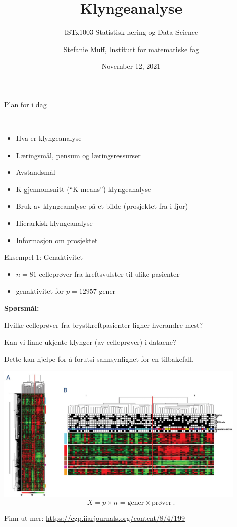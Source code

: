 \documentclass[10pt,ignorenonframetext,]{beamer}
\title{Klyngeanalyse}
\subtitle{ISTx1003 Statistisk læring og Data Science}
\author{Stefanie Muff, Institutt for matematiske fag}
\date{November 12, 2021}
\begin{document}
\frame{\titlepage}

\begin{frame}{Plan for i dag}
\protect\hypertarget{plan-for-i-dag}{}

\(~\)

\begin{itemize}
\item
  Hva er klyngeanalyse
\item
  Læringsmål, pensum og læringsressurser
\item
  Avstandsmål
\item
  K-gjennomsnitt (``K-means'') klyngeanalyse
\item
  Bruk av klyngeanalyse på et bilde (prosjektet fra i fjor)
\item
  Hierarkisk klyngeanalyse
\item
  Informasjon om prosjektet
\end{itemize}

\end{frame}

\begin{frame}{Eksempel 1: Genaktivitet}
\protect\hypertarget{eksempel-1-genaktivitet}{}

\begin{itemize}
\item
  \(n=81\) celleprøver fra kreftsvulster til ulike pasienter
\item
  genaktivitet for \(p =12957\) gener
\end{itemize}

\vspace{2mm}

\textbf{Spørsmål:}

Hvilke celleprøver fra brystkreftpasienter ligner hverandre mest?

Kan vi finne ukjente klynger (av celleprøver) i dataene?

Dette kan hjelpe for å forutsi sannsynlighet for en tilbakefall.

\end{frame}

\begin{frame}

\centering

\includegraphics[width=0.9\textwidth,height=\textheight]{gene_expression.jpg}
\[ X = p\times n  =  \text{gener} \times \text{prøver}  \ .\]

\tiny

Finn ut mer: \url{https://cgp.iiarjournals.org/content/8/4/199}

\end{frame}
\end{document}
